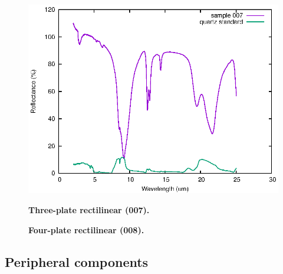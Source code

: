 \documentclass[10pt,twoside,openany]{article}
\theoremstyle{definition}
\begin{document}
\begin{figure}
  {\includegraphics[angle=0,width=1.0\textwidth]{007.eps}}%
  {\caption{\label{fig:007}\textbf{Three-plate rectilinear (007).}}}
  \end{figure}
  \begin{figure}
  {\caption{\label{fig:008}\textbf{Four-plate rectilinear (008).}}}
\end{figure}

\subsection{Peripheral components}
\end{document}
